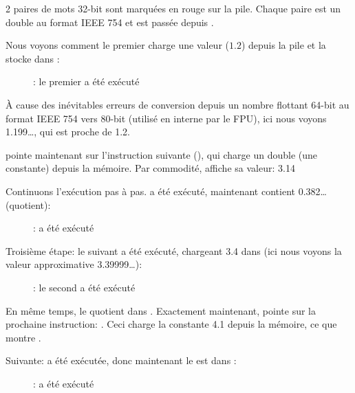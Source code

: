 ﻿\clearpage
{}
\myindex{\olly}

2 paires de mots 32-bit sont marquées en rouge sur la pile.
Chaque paire est un double au format IEEE 754 et est passée depuis \main.

Nous voyons comment le premier \FLD charge une valeur ($1.2$) depuis la pile et la
stocke dans :

\begin{figure}[H]
\centering
{}
\caption{\olly: le premier \FLD a été exécuté}
\label{fig:FPU_simple_olly_1}
\end{figure}

À cause des inévitables erreurs de conversion depuis un nombre flottant 64-bit au
format IEEE 754 vers 80-bit (utilisé en interne par le FPU), ici nous voyons 1.199\ldots,
qui est proche de 1.2.

\EIP pointe maintenant sur l'instruction suivante (\FDIV), qui charge un double
(une constante) depuis la mémoire.
Par commodité, \olly affiche sa valeur: 3.14

\clearpage
Continuons l'exécution pas à pas.
\FDIV a été exécuté, maintenant  contient 0.382\ldots
(\gls{quotient}):

\begin{figure}[H]
\centering
{}
\caption{\olly: \FDIV a été exécuté}
\label{fig:FPU_simple_olly_2}
\end{figure}

\clearpage
Troisième étape: le \FLD suivant a été exécuté, chargeant 3.4 dans  (ici nous
voyons la valeur approximative 3.39999\ldots):

\begin{figure}[H]
\centering
{}
\caption{\olly: le second \FLD a été exécuté}
\label{fig:FPU_simple_olly_3}
\end{figure}

En même temps, le \gls{quotient}  dans .
Exactement maintenant, \EIP pointe sur la prochaine instruction: \FMUL.
Ceci charge la constante 4.1 depuis la mémoire, ce que montre \olly.

\clearpage
Suivante: \FMUL a été exécutée, donc maintenant le  est dans :

\begin{figure}[H]
\centering
{}
\caption{\olly: \FMUL a été exécuté}
\label{fig:FPU_simple_olly_4}
\end{figure}

